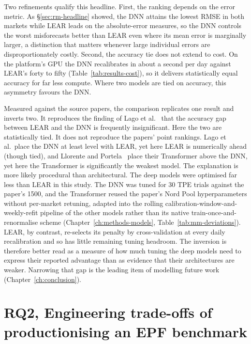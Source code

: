 Two refinements qualify this headline. First, the ranking depends on the error
metric. As \S\ref{sec:rm-headline} showed, the DNN attains the lowest RMSE in
both markets while LEAR leads on the absolute-error measures, so the DNN
controls the worst misforecasts better than LEAR even where its mean
error is marginally larger, a distinction that matters whenever large
individual errors are disproportionately costly. Second, the accuracy tie does
not extend to cost. On the platform's GPU the DNN recalibrates in about a second
per day against LEAR's forty to fifty (Table~\ref{tab:results-cost}), so it
delivers statistically equal accuracy for far less compute. Where two
models are tied on accuracy, this asymmetry favours the DNN.

Measured against the source papers, the comparison replicates one result and
inverts two. It reproduces the finding of Lago et al.~\cite{lago2021} that the
accuracy gap between LEAR and the DNN is frequently insignificant. Here the two
are statistically tied. It does not reproduce the papers' point rankings. Lago
et al.\ place the DNN at least level with LEAR, yet here LEAR is numerically
ahead (though tied), and Llorente and Portela~\cite{llorente2025transformer}
place their Transformer above the DNN, yet here the Transformer is significantly
the weakest model. The explanation is more likely procedural than
architectural. The deep models were optimised far less than LEAR in this study.
The DNN was tuned for 30 TPE trials against the paper's 1500, and the
Transformer reused the paper's Nord Pool hyperparameters without per-market
retuning, adapted into the rolling calibration-window-and-weekly-refit pipeline
of the other models rather than its native train-once-and-renormalise scheme
(Chapter~\ref{ch:methods-models}, Table~\ref{tab:mm-deviations}). LEAR, by
contrast, re-selects its penalty by cross-validation at every daily
recalibration and so has little remaining tuning headroom. The inversion is
therefore better read as a measure of how much tuning the deep models need to
express their reported advantage than as evidence that their architectures are
weaker. Narrowing that gap is the leading item of modelling future work
(Chapter~\ref{ch:conclusion}).

\section{RQ2, Engineering trade-offs of productionising an EPF benchmark}

